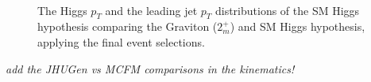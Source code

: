 \begin{figure}[!hbtp]
\centering
{}
\\
\caption{The Higgs $p_T$ and the leading jet $p_T$ distributions of the 
SM Higgs hypothesis comparing the Graviton ($2_m^+$) and SM Higgs hypothesis, 
applying the final event selections. 
}
\label{fig:gravvshiggspt_0j}
\end{figure}


{\it add the JHUGen vs MCFM comparisons in the kinematics!}